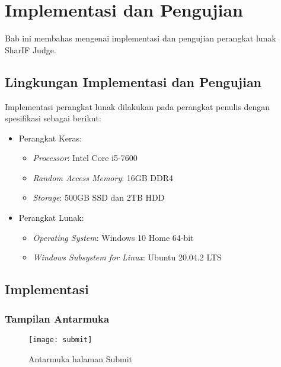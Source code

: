 \chapter{Implementasi dan Pengujian}
\label{chap:implementasidanpengujian}

Bab ini membahas mengenai implementasi dan pengujian perangkat lunak SharIF Judge.

\section{Lingkungan Implementasi dan Pengujian}
\label{sec:5:lingkungan}

Implementasi perangkat lunak dilakukan pada perangkat penulis dengan spesifikasi sebagai berikut:

\begin{itemize}
    \item Perangkat Keras:
    \begin{itemize}
        \item \textit{Processor}: Intel Core i5-7600
        \item \textit{Random Access Memory}: 16GB DDR4
        \item \textit{Storage}: 500GB SSD dan 2TB HDD
    \end{itemize}
        \item Perangkat Lunak:
    \begin{itemize}
        \item \textit{Operating System}: Windows 10 Home 64-bit
        \item \textit{Windows Subsystem for Linux}: Ubuntu 20.04.2 LTS
    \end{itemize}
\end{itemize}

\section{Implementasi}
\label{sec:5:implementasi}

\subsection{Tampilan Antarmuka}
\label{subsec:5:antarmuka}

\begin{figure}[H]
	\centering  
	\texttt{[image: submit]}  
	\caption{Antarmuka halaman Submit} 
	\label{fig:5:antarmuka} 
\end{figure}

